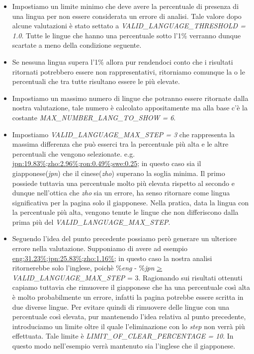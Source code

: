 \documentclass{article}
\newcommand{\function}[1]{\textit{#1}}
\newcommand{\mintedstyle}[1]{\url{#1}}
\begin{document}
\begin{itemize}
    \item Impostiamo un limite minimo che deve avere la percentuale di presenza di una lingua per non essere considerata un errore di analisi. Tale valore dopo alcune valutazioni è stato settato a \function{VALID\_LANGUAGE\_THRESHOLD = 1.0}. Tutte le lingue che hanno una percentuale sotto l'1\% verranno dunque scartate a meno della condizione seguente.
    \item Se nessuna lingua supera l'1\% allora pur rendendoci conto che i risultati ritornati potrebbero essere non rappresentativi, ritorniamo comunque la o le percentuali che tra tutte risultano essere le più elevate.
    \item Impostiamo un massimo numero di lingue che potranno essere ritornate dalla nostra valutazione, tale numero è calcolato appositamente ma alla base c'è la costante \function{MAX\_NUMBER\_LANG\_TO\_SHOW = 6}.
    \item Impostiamo \function{VALID\_LANGUAGE\_MAX\_STEP = 3} che rappresenta la massima differenza che può esserci tra la percentuale più alta e le altre percentuali che vengono selezionate. e.g. \mintedstyle{jpn:19.83\%;zho:2.96\%;ron:0.49\%;swe:0.25;} in questo caso sia il giapponese(\textit{jpn}) che il cinese(\textit{zho}) superano la soglia minima. Il primo possiede tuttavia una percentuale molto più elevata rispetto al secondo e dunque nell'ottica che \textit{zho} sia un errore, ha senso ritornare come lingua significativa per la pagina solo il giapponese. Nella pratica, data la lingua con la percentuale più alta, vengono tenute le lingue che non differiscono dalla prima più del \function{VALID\_LANGUAGE\_MAX\_STEP}.
    \item Seguendo l'idea del punto precedente possiamo però generare un ulteriore errore nella valutazione. Supponiamo di avere ad esempio \mintedstyle{eng:31.23\%;jpn:25.83\%;zho:1.16\%;} in questo caso la nostra analisi ritornerebbe solo l'inglese, poichè \%\textit{eng} - \%\textit{jpn} \mintedstyle{>} \function{VALID\_LANGUAGE\_MAX\_STEP} = 3. Ragionando sui risultati ottenuti capiamo tuttavia che rimuovere il giapponese che ha una percentuale così alta è molto probabilmente un errore, infatti la pagina potrebbe essere scritta in due diverse lingue. Per evitare quindi di rimuovere delle lingue con una percentuale così elevata, pur mantenendo l'idea relativa al punto precedente, introduciamo un limite oltre il quale l'eliminazione con lo \textit{step} non verrà più effettuata. Tale limite è \function{LIMIT\_OF\_CLEAR\_PERCENTAGE = 10}. In questo modo nell'esempio verrà mantenuto sia l'inglese che il giapponese.
\end{itemize}
\end{document}
